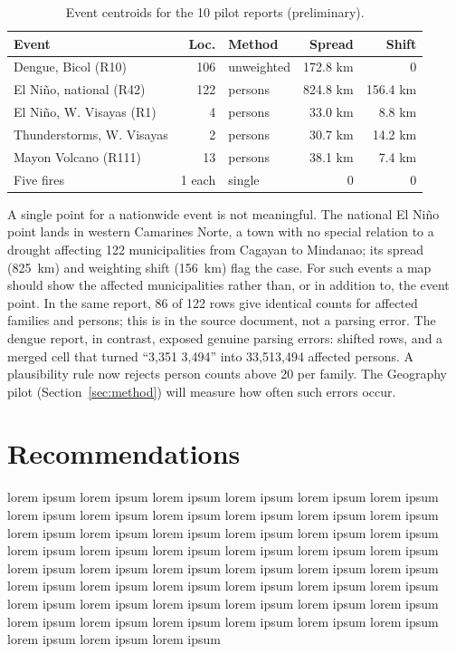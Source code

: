 \documentclass[acmtog]{acmart}
\begin{document}
\begin{table}[t]
  \caption{Event centroids for the 10 pilot reports (preliminary).}
  \label{tab:pilot}
  \footnotesize
  \setlength{\tabcolsep}{3pt}
  \begin{tabular}{p{2.6cm}rp{1.5cm}rr}
    \toprule
    Event & Loc. & Method & Spread & Shift \\
    \midrule
    Dengue, Bicol (R10) & 106 & unweighted & 172.8 km & 0 \\
    El Ni\~no, national (R42) & 122 & persons & 824.8 km & 156.4 km \\
    El Ni\~no, W. Visayas (R1) & 4 & persons & 33.0 km & 8.8 km \\
    Thunderstorms, W. Visayas & 2 & persons & 30.7 km & 14.2 km \\
    Mayon Volcano (R111) & 13 & persons & 38.1 km & 7.4 km \\
    Five fires & 1 each & single & 0 & 0 \\
    \bottomrule
  \end{tabular}
\end{table}

A single point for a nationwide event is not meaningful. The national El Ni\~no point lands in
western Camarines Norte, a town with no special relation to a drought affecting 122 municipalities
from Cagayan to Mindanao; its spread (825~km) and weighting shift (156~km) flag the case. For such
events a map should show the affected municipalities rather than, or in addition to, the event
point. In the same report, 86 of 122 rows give identical counts for affected families and persons;
this is in the source document, not a parsing error. The dengue report, in contrast, exposed
genuine parsing errors: shifted rows, and a merged cell that turned ``3,351 3,494'' into 33,513,494
affected persons. A plausibility rule now rejects person counts above 20 per family. The
Geography pilot (Section~\ref{sec:method}) will measure how often such errors occur.

\section{Recommendations}

lorem ipsum  lorem ipsum  lorem ipsum  lorem ipsum  lorem ipsum  lorem ipsum  lorem ipsum  lorem ipsum  lorem ipsum  lorem ipsum  lorem ipsum  lorem ipsum  lorem ipsum  lorem ipsum  lorem ipsum  lorem ipsum  lorem ipsum  lorem ipsum  lorem ipsum  lorem ipsum  lorem ipsum  lorem ipsum  lorem ipsum  lorem ipsum  lorem ipsum  lorem ipsum  lorem ipsum  lorem ipsum  lorem ipsum  lorem ipsum  lorem ipsum  lorem ipsum  lorem ipsum  lorem ipsum  lorem ipsum  lorem ipsum  lorem ipsum  lorem ipsum  lorem ipsum  lorem ipsum  lorem ipsum  lorem ipsum  lorem ipsum  lorem ipsum  lorem ipsum  lorem ipsum  lorem ipsum  lorem ipsum  lorem ipsum  lorem ipsum  lorem ipsum  
\end{document}
